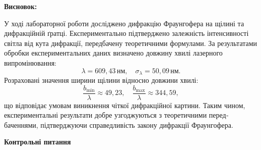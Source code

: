 \documentclass[12pt,a4paper]{article}
\begin{document}
    \newpage

    \textbf{Висновок:}

    У ході лабораторної роботи досліджено дифракцію Фраунгофера на щілині та дифракційній ґратці. Експериментально підтверджено залежність інтенсивності світла від кута дифракції, передбачену теоретичними формулами. За результатами обробки експериментальних даних визначено довжину хвилі лазерного випромінювання:
    \[
    \lambda = 609{,}43\,\text{нм},\quad \sigma_{\lambda} = 50{,}09\,\text{нм}.
    \]
    Розраховані значення ширини щілини відносно довжини хвилі:
    \[
    \frac{b_{\min}}{\lambda} \approx 49{,}23,\quad \frac{b_{\max}}{\lambda} \approx 344{,}59,
    \]
    що відповідає умовам виникнення чіткої дифракційної картини. Таким чином, експериментальні результати добре узгоджуються з теоретичними перед­баченнями, підтверджуючи справедливість закону дифракції Фраунгофера.







\begin{center} \textbf{\large Контрольні питання} \end{center}
\end{document}
